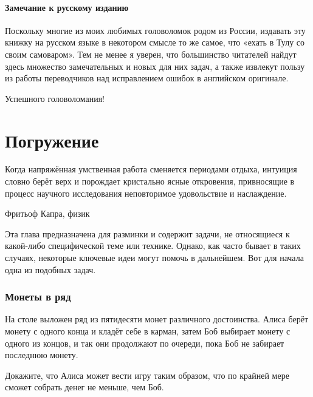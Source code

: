 \documentclass[twoside]{book}
\makeatletter
\newcommand{\rindex}[2][\imki@jobname]{%
  \index[#1]{\detokenize{#2}}%
}
\makeatother
\begin{document}

\subsubsection*{Замечание к русскому изданию}

Поскольку многие из моих любимых головоломок родом из России, издавать эту книжку на русском языке в некотором смысле то же самое, что «ехать в Тулу со своим самоваром».
Тем не менее я уверен, что большинство читателей найдут здесь множество замечательных и новых для них задач, а также извлекут пользу из работы переводчиков над исправлением ошибок в английском оригинале.

Успешного головоломания!




\chapter{Погружение} 

\setlength{\epigraphwidth}{.6\textwidth}
\epigraph{Когда напряжённая умственная работа сменяется периодами отдыха, интуиция словно берёт верх и порождает кристально ясные откровения, привносящие в процесс научного исследования неповторимое удовольствие и наслаждение.\vspace{1ex}}{Фритьоф Капра, физик}

Эта глава предназначена для разминки и содержит задачи, не относящиеся к какой-либо специфической теме или технике.
Однако, как часто бывает в таких случаях, некоторые ключевые идеи могут помочь в дальнейшем.
 Вот для начала одна из подобных задач.

\subsection*{Монеты в ряд} %
\rindex{Монеты в ряд}

На столе выложен ряд из пятидесяти монет различного достоинства.
Алиса берёт монету с одного конца и кладёт себе в карман, затем Боб выбирает монету с одного из концов, и так они продолжают по очереди, пока Боб не забирает последнюю монету.

Докажите, что Алиса может вести игру таким образом, что по крайней мере сможет собрать денег не меньше, чем Боб.
\end{document}
